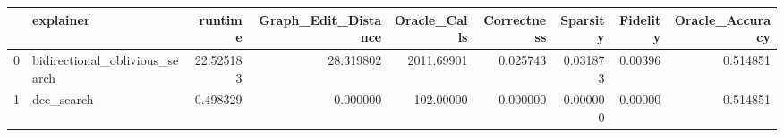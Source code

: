 \begin{tabular}{llrrrrrrr}
\toprule
{} &                       explainer &    runtime &  Graph\_Edit\_Distance &  Oracle\_Calls &  Correctness &  Sparsity &  Fidelity &  Oracle\_Accuracy \\
\midrule
0 &  bidirectional\_oblivious\_search &  22.525183 &            28.319802 &    2011.69901 &     0.025743 &  0.031873 &   0.00396 &         0.514851 \\
1 &                      dce\_search &   0.498329 &             0.000000 &     102.00000 &     0.000000 &  0.000000 &   0.00000 &         0.514851 \\
\bottomrule
\end{tabular}

